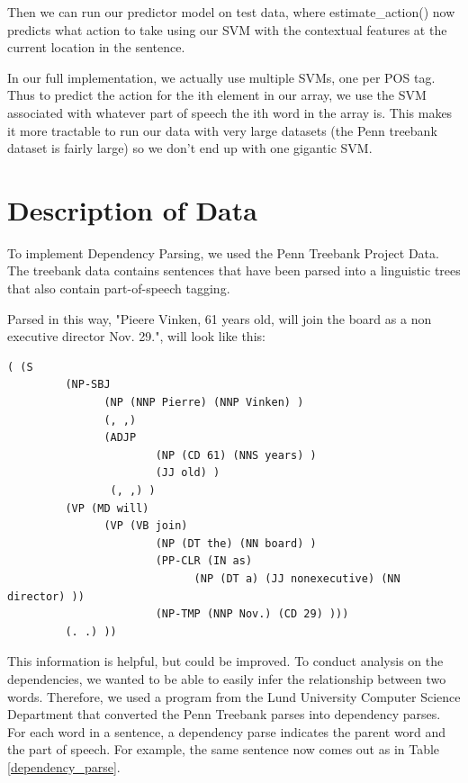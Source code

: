 \documentclass[12pt]{amsart}
\begin{document}
Then we can run our predictor model on test data, where estimate\_action()
now predicts what action to take using our SVM with the contextual
features at the current location in the sentence.

In our full implementation, we actually use multiple SVMs, one per POS tag.
Thus to predict the action for the ith element in our array, we use the SVM
associated with whatever part of speech the ith word in the array is. This
makes it more tractable to run our data with very large datasets (the Penn
treebank dataset is fairly large) so we don't end up with one gigantic SVM.

\section{Description of Data}
To implement Dependency Parsing, we used the Penn Treebank Project Data. The treebank data contains sentences that have been parsed into a linguistic trees that also contain part-of-speech tagging.

Parsed in this way, "Pieere Vinken, 61 years old, will join the board as a non executive director Nov. 29.", will look like this: 
\begin{verbatim}
( (S
         (NP-SBJ 
               (NP (NNP Pierre) (NNP Vinken) )
               (, ,) 
               (ADJP
                       (NP (CD 61) (NNS years) )
                       (JJ old) )
                (, ,) )
         (VP (MD will) 
               (VP (VB join) 
                       (NP (DT the) (NN board) )
                       (PP-CLR (IN as) 
                             (NP (DT a) (JJ nonexecutive) (NN director) ))
                       (NP-TMP (NNP Nov.) (CD 29) )))
         (. .) ))\end{verbatim}

This information is helpful, but could be improved. To conduct analysis on the dependencies, we wanted to be able to easily infer the relationship between two words. Therefore, we used a program from the Lund University Computer Science Department that converted the Penn Treebank parses into dependency parses. For each word in a sentence, a dependency parse indicates the parent word and the part of speech. For example, the same sentence now comes out as in Table \ref{dependency_parse}.
\end{document}
